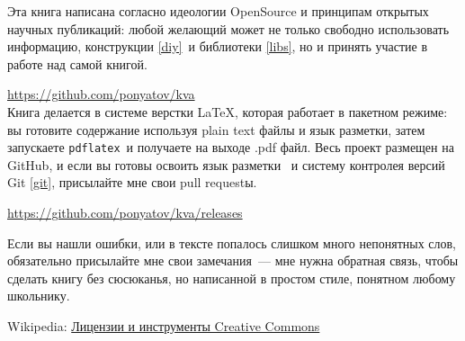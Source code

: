 

\bigskip

\noindent
Эта книга написана согласно идеологии OpenSource и принципам открытых научных
публикаций: любой желающий может не только свободно использовать информацию,
конструкции \ref{diy}\ и библиотеки \ref{libs}, но и принять участие в работе
над самой книгой. \licence


\bigskip
\url{https://github.com/ponyatov/kva}\\

\clearpage 
Книга делается в системе верстки \LaTeX{}, которая работает в пакетном
режиме:
вы готовите содержание используя plain text файлы и язык разметки, затем
запускаете \verb|pdflatex|\ и получаете на выходе .pdf файл. Весь проект
размещен на GitHub, и если вы готовы освоить язык разметки \cite{lvovsky}\ и
систему контролея версий Git \ref{git}, присылайте мне свои pull requestы.

\medskip 
\url{https://github.com/ponyatov/kva/releases}

\bigskip
Если вы нашли ошибки, или в тексте попалось слишком много непонятных слов,
обязательно присылайте мне свои замечания\ --- мне нужна обратная связь, чтобы
сделать книгу без сюсюканья, но написанной в простом стиле, понятном
любому школьнику.


Wikipedia:
\href{https://ru.wikipedia.org/wiki/%D0%9B%D0%B8%D1%86%D0%B5%D0%BD%D0%B7%D0%B8%D0%B8_%D0%B8_%D0%B8%D0%BD%D1%81%D1%82%D1%80%D1%83%D0%BC%D0%B5%D0%BD%D1%82%D1%8B_Creative_Commons}{Лицензии и инструменты Creative Commons}
\bigskip

